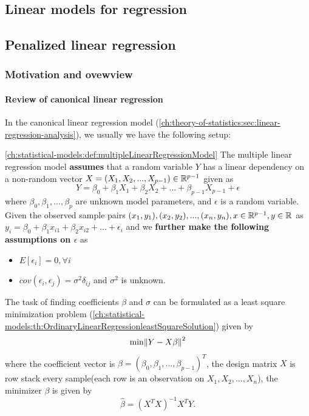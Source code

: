 \begin{refsection}
	\startcontents[chapters]	
	\chapter{Linear models for regression}\label{ch:statistical-learning-linear-models}

\section{Penalized linear regression}\label{ch:statistical-learning-linear-models:sec:PenalizedLinearRegression}

\subsection{Motivation and ovewview}

\subsubsection{Review of canonical linear regression}
In the canonical linear regression model (\autoref{ch:theory-of-statistics:sec:linear-regression-analysis}), we usually we have the following setup:

\begin{definition}\autoref{ch:statistical-models:def:multipleLinearRegressionModel}
	The multiple linear regression model \textbf{assumes} that a random variable $Y$ has a linear dependency on a non-random vector $X = (X_1,X_2,...,X_{p-1}) \in \mathbb{R}^{p-1}$ given as
	$$Y = \beta_0 + \beta_1 X_1 +\beta_2 X_2 + ... +\beta_{p-1} X_{p-1} + \epsilon$$
	where $\beta_0,\beta_1, ...,\beta_p$ are unknown model parameters, and $\epsilon$ is a random variable. 
	Given the observed sample pairs $(x_1,y_1),(x_2,y_2),..., (x_n,y_n), x\in \mathbb{R}^{p-1}, y\in \mathbb{R}$ as $y_i = \beta_0 + \beta_1 x_{i1} + \beta_2 x_{i2} + ... + \epsilon_i$ and we \textbf{further make the following assumptions on $\epsilon$} as
	\begin{itemize}
		\item $E[\epsilon_i] = 0,\forall i$
		\item $cov(\epsilon_i,\epsilon_j) = \sigma^2\delta_{ij}$ and $\sigma^2$ is unknown.
	\end{itemize} 	
\end{definition}

The task of finding coefficients $\beta$ and $\sigma$ can be formulated as a least square minimization problem (\autoref{ch:statistical-models:th:OrdinaryLinearRegressionleastSquareSolution}) given by
$$\min \norm{Y-X\beta}^2$$
where the coefficient vector is $\beta = (\beta_0,\beta_1,...,\beta_{p-1})^T$, the design matrix $X$ is row stack every sample(each row is an observation on $X_1,X_2,...,X_n$), the minimizer $\beta$ is given by
$$\hat{\beta} = (X^TX)^{-1}X^TY.$$


\end{refsection}
